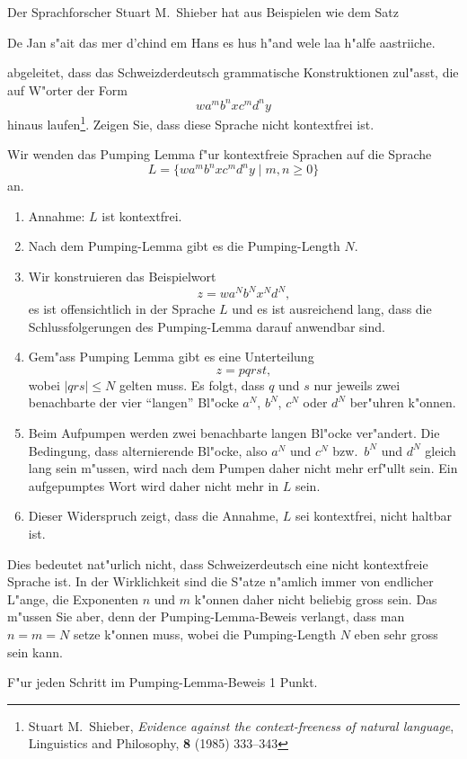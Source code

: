 Der Sprachforscher Stuart M.~Shieber hat aus Beispielen wie dem Satz
\begin{center}
De Jan s"ait das mer d'chind em Hans es hus h"and wele laa h"alfe aastriiche.
\end{center}
abgeleitet, dass das Schweizderdeutsch grammatische Konstruktionen
zul"asst, die auf W"orter der Form
\[
wa^mb^nxc^md^ny
\]
hinaus laufen\footnote{Stuart M.~Shieber,
{\em Evidence against the context-freeness of natural language},
Linguistics and Philosophy, {\bf 8} (1985) 333--343}.
Zeigen Sie, dass diese Sprache nicht kontextfrei ist.

\begin{loesung}
Wir wenden das Pumping Lemma f"ur kontextfreie Sprachen auf die Sprache
\[
L=\{
wa^mb^nxc^md^ny
\;|\; m,n\ge 0
\}
\]
an.
\begin{enumerate}
\item Annahme: $L$ ist kontextfrei.
\item Nach dem Pumping-Lemma gibt es die Pumping-Length $N$.
\item Wir konstruieren das Beispielwort
\[
z=wa^Nb^Nx^Nd^N,
\]
es ist offensichtlich in der Sprache $L$
und es ist ausreichend lang, dass die Schlussfolgerungen des Pumping-Lemma
darauf anwendbar sind.
\item
Gem"ass Pumping Lemma gibt es eine Unterteilung
\[
z=pqrst,
\]
wobei $|qrs|\le N$ gelten muss.
Es folgt, dass $q$ und $s$ nur jeweils zwei benachbarte der
vier ``langen'' Bl"ocke $a^N$, $b^N$, $c^N$ oder $d^N$ ber"uhren k"onnen.
\item 
Beim Aufpumpen werden zwei benachbarte langen Bl"ocke ver"andert.
Die Bedingung, dass alternierende Bl"ocke, also $a^N$ und $c^N$
bzw.~$b^N$ und $d^N$ gleich lang sein m"ussen, wird nach dem Pumpen
daher nicht mehr erf"ullt sein.
Ein aufgepumptes Wort wird daher nicht mehr in $L$ sein.
\item Dieser Widerspruch zeigt, dass die Annahme, $L$ sei kontextfrei,
nicht haltbar ist.
\end{enumerate}
\end{loesung}

\begin{diskussion}
Dies bedeutet nat"urlich nicht, dass Schweizerdeutsch eine nicht
kontextfreie Sprache ist.
In der Wirklichkeit sind die S"atze n"amlich immer von endlicher L"ange,
die Exponenten $n$ und $m$ k"onnen daher nicht beliebig gross sein.
Das m"ussen Sie aber, denn der Pumping-Lemma-Beweis verlangt, dass man
$n=m=N$ setze k"onnen muss, wobei die Pumping-Length $N$ eben sehr gross
sein kann.
\end{diskussion}

\begin{bewertung}
F"ur jeden Schritt im Pumping-Lemma-Beweis 1 Punkt.
\end{bewertung}

